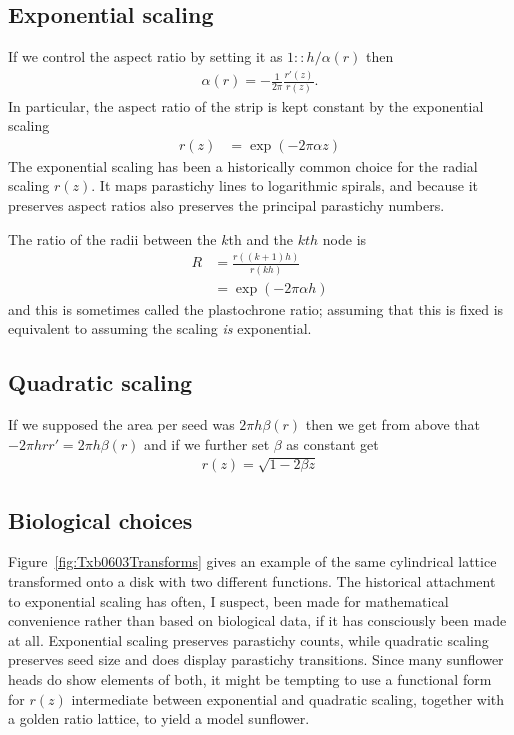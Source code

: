 \subsection{Exponential scaling}
 If we control the aspect ratio by setting it as  $1:: h/\alpha(r)$ then
\begin{align}
\alpha(r) = -\frac{1}{2\pi}\frac{r'(z)}{r(z)}.
\end{align}
In particular, the aspect ratio of the strip is kept constant by the exponential scaling
\begin{align}
{r(z)} &= \exp(-2\pi\alpha z)
\end{align}
The exponential scaling has been a historically common choice for the radial scaling $r(z)$. It maps parastichy lines to logarithmic spirals, and because it preserves aspect ratios also preserves the principal parastichy numbers. 

The ratio of the radii between the $k$th and the $kth$ node is 
\begin{align}
R &= \frac{r((k+1) h)}{ r(kh)} 
\\
&= \exp (-2 \pi \alpha h) \label{eq:plastoratio}
\end{align}
and this is sometimes called the plastochrone ratio; assuming that this is fixed is equivalent to assuming the scaling \textit{is} exponential. 



\subsection{Quadratic scaling}
 If we supposed the area per seed was $2 \pi h \beta (r)$ then we get from above that $-2\pi h  r r'=2\pi h \beta (r)$ and if we further set $\beta$ as constant get
\begin{align}
	r(z) = \sqrt{ 1- 2\beta z } 
\end{align}
 



\subsection{Biological choices}
 Figure~\ref{fig:Txb0603Transforms} gives an example of the same cylindrical lattice transformed onto a disk with two different functions.
The historical attachment to exponential scaling has often, I suspect, been made for mathematical convenience rather than based on biological data, if it has consciously been made at all. Exponential scaling   preserves parastichy counts, while quadratic scaling preserves seed size and does display parastichy transitions. Since many sunflower heads do show elements of both, it might be tempting to use a functional form for $r(z)$ intermediate between exponential and quadratic scaling, together with a golden ratio lattice, to yield a model sunflower. 

